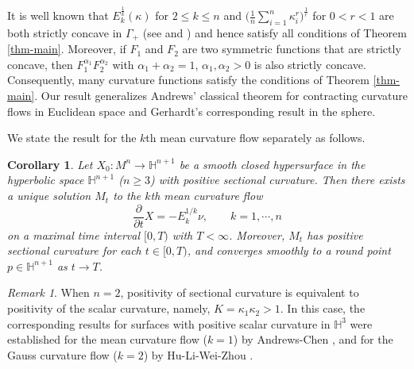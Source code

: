 \documentclass[11pt,reqno]{amsart}
\newtheorem{corollary}[proposition]{Corollary}
\theoremstyle{remark}
\newtheorem{remark}[proposition]{Remark}
\numberwithin{equation}{section}
\begin{document}
It is well known that $E_k^{\frac{1}{k}}(\kappa)$ for $2\leq k\leq n$ and $\bigl( \frac{1}{n}\sum_{i=1}^n \kappa_i^r \bigr)^{\frac{1}{r}}$ for $0< r<1$ are both strictly concave in $\Gamma_+$ (see \cite[Theorem 3.2]{Ger15} and \cite[Lemma 3.2]{Yu16}) and hence satisfy all conditions of Theorem \ref{thm-main}. Moreover, if $F_1$ and $F_2$ are two symmetric functions that are strictly concave, then $F_1^{\alpha_1}F_2^{\alpha_2}$ with $\alpha_1+\alpha_2=1$, $\alpha_1,\alpha_2>0$ is also strictly concave. Consequently, many curvature functions satisfy the conditions of Theorem \ref{thm-main}. Our result generalizes Andrews’ \cite{And07} classical theorem for contracting curvature flows in Euclidean space and Gerhardt’s \cite{Ger15} corresponding result in the sphere. 
		
We state the result for the $k$th mean curvature flow separately as follows.
\begin{corollary}
Let $X_0:M^n \to \mathbb{H}^{n+1}$ be a smooth closed hypersurface in the hyperbolic space $\mathbb{H}^{n+1}$ ($n\geq 3$) with positive sectional curvature. Then there exists a unique solution $M_t$ to the $k$th mean curvature flow
\[\frac{\partial }{\partial t}X=-E_k^{1/k}\nu,\qquad k=1,\cdots,n  \]
on a maximal time interval $[0,T)$ with $T<\infty$. Moreover, $M_t$ has positive sectional curvature for each $t\in[0,T)$, and converges smoothly to a round point $p\in\mathbb{H}^{n+1}$ as $t\to T$. 
\end{corollary}

\begin{remark}
When $n=2$, positivity of sectional curvature is equivalent to positivity of the scalar curvature, namely, $K=\kappa_1\kappa_2>1$. In this case, the corresponding results for surfaces with positive scalar curvature in $\mathbb{H}^3$ were established for the mean curvature flow ($k=1$) by Andrews-Chen \cite{AC17}, and for the Gauss curvature flow ($k=2$) by Hu-Li-Wei-Zhou \cite{HLWZ20}.
\end{remark}
\end{document}
